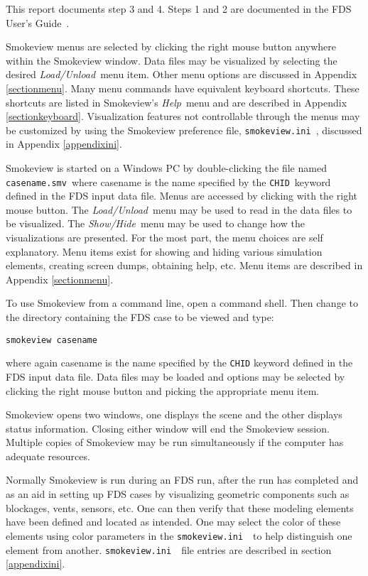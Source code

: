 \documentclass[11pt,twoside]{book}
\newcommand{\svini}{{\tt smokeview.ini}\ }
\begin{document}
\noindent This report documents step 3 and 4. Steps 1 and 2 are
documented in the FDS User's Guide~\cite{FDS_Users_Guide}.

Smokeview menus are selected by clicking the right mouse
button anywhere within the Smokeview window.  Data files may be
visualized by selecting the desired {\em Load/Unload}\ menu item.
Other menu options are discussed in Appendix
\ref{sectionmenu}. Many menu commands have equivalent keyboard
shortcuts. These shortcuts are listed in Smokeview's {\em Help}\
menu and are described in Appendix \ref{sectionkeyboard}.
Visualization features not controllable through the menus may be
customized by using the Smokeview preference file, \svini,
discussed in Appendix \ref{appendixini}.

Smokeview  is started on a Windows PC by double-clicking the file
named {\tt casename.smv}\ where casename is the name specified by
the {\tt CHID}\ keyword defined in the FDS input data file. Menus
are accessed by clicking with the right mouse button.  The {\em
Load/Unload}\ menu may be used to read in the data files to be
visualized. The {\em Show/Hide}\ menu may be used to change how
the visualizations are presented. For the most part, the menu
choices are self explanatory. Menu items exist for showing and
hiding various simulation elements, creating screen dumps,
obtaining help, etc. Menu items are described in Appendix
\ref{sectionmenu}.

To use Smokeview from a command line, open a command shell. Then
change to the directory containing the FDS case to be viewed and
type:
\begin{lstlisting}
smokeview casename
\end{lstlisting}
where again casename is the name specified by the {\tt CHID}
keyword defined in the FDS input data file. Data files may be
loaded and options may be selected by clicking the right mouse
button and picking the appropriate menu item.


Smokeview opens two windows, one displays the scene and the other
displays status information. Closing either window will end the
Smokeview session.  Multiple copies of Smokeview may be run
simultaneously if the computer has adequate resources.

Normally Smokeview is run during an FDS run, after the run has
completed and as an aid in setting up FDS cases by visualizing
geometric components such as blockages, vents, sensors, etc. One
can then verify that these modeling elements have been defined and
located as intended. One may select the color of these elements
using color parameters in the \svini\ to help distinguish one
element from another. \svini\ file entries are described in
section \ref{appendixini}.
\end{document}
